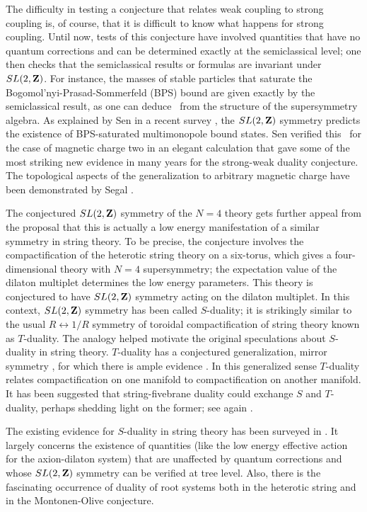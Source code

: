 \documentclass[12pt]{article}
\numberwithin{equation}{section}
\begin{document}
The difficulty in testing a conjecture that relates weak coupling
to strong coupling is, of course, that it is difficult to know what
happens for strong coupling.
Until now, tests of this conjecture have involved quantities that have no
quantum corrections and can
be determined exactly at the semiclassical level; one then checks
that the semiclassical results or formulas are invariant under
$SL(2,{\bf Z})$. For instance, the masses of stable
particles that saturate the Bogomol'nyi-Prasad-Sommerfeld (BPS) bound
are given exactly by the semiclassical result, as one can deduce
\cite{wo}\ from the structure of the supersymmetry algebra.
As explained by Sen in a recent survey \cite{seni},
the $SL(2,{\bf Z})$ symmetry predicts the existence of BPS-saturated
multimonopole bound states.  Sen verified this
\cite{senii}\ for the case of magnetic charge two
in an elegant calculation that gave some of the
most striking new evidence in many years
for the strong-weak duality conjecture.
The topological aspects of the generalization to arbitrary magnetic
charge have been demonstrated by Segal
\cite{segal}.

\bigskip
{}

The conjectured $SL(2,{\bf Z})$ symmetry of the $N=4$ theory gets
further appeal from the proposal that this is actually
a low energy manifestation of a similar symmetry in string theory.
To be precise, the conjecture \cite{sench}
involves the compactification of the heterotic string theory
on a six-torus,
which gives a four-dimensional theory with $N=4$ supersymmetry;
the expectation value of the dilaton multiplet determines the low energy
parameters.
This theory is conjectured to have $SL(2,{\bf Z})$ symmetry acting on
the dilaton multiplet.
In this context, $SL(2,{\bf Z})$ symmetry has been called $S$-duality;
it is strikingly similar to the usual $R\leftrightarrow 1/R$ symmetry
of toroidal compactification of string theory known as $T$-duality.
The analogy helped motivate the original speculations about $S$-duality in
string theory.
$T$-duality has a conjectured generalization, mirror symmetry
\cite{dix,lvw}, for
which there is ample evidence \cite{Greene,Cand,yau}.  In this
generalized sense $T$-duality relates
compactification on one manifold to compactification on another manifold.
It has been suggested that
string-fivebrane duality \cite{duff,strom}
could exchange $S$ and $T$-duality, perhaps shedding light on the former;
see again \cite{seni}.

The existing evidence for $S$-duality in string theory
has been surveyed in \cite{seni}.  It largely
concerns the existence of quantities (like the low energy effective
action for the axion-dilaton system) that are unaffected by quantum
corrections and whose $SL(2,{\bf Z})$ symmetry can be verified at tree
level.  Also, there is the fascinating occurrence of duality of root
systems both in the heterotic string and in the Montonen-Olive conjecture.
\end{document}
